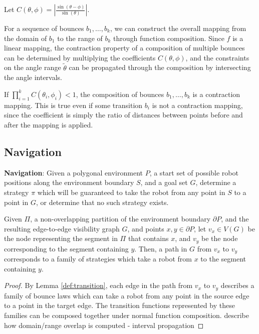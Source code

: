 \documentclass[]{styles/svproc}  %
\begin{document}
Let $C(\theta, \phi) = | \frac{\sin(\theta - \phi)}{\sin(\theta)} |$.

For a sequence of bounces $b_1, \ldots, b_k$, we can construct the overall
mapping from the domain of $b_1$ to the range of $b_k$ through function
composition. Since $f$ is a linear mapping, the contraction property of a composition 
of multiple bounces can be determined by multiplying the coefficients $C(\theta, \phi)$, 
and the constraints on the angle range $\tilde{\theta}$ can be propagated through the 
composition by intersecting the angle intervals.

If $\prod_{i=1}^k C(\theta_i, \phi_i) < 1$, the composition of bounces $b_1, \ldots, b_k$
is a contraction mapping. This is true even if some transition $b_i$ is not a
contraction mapping, since the coefficient is simply the ratio of distances
between points before and after the mapping is applied.

\subsection{Navigation}

\begin{definition}
\textbf{Navigation}:
Given a polygonal environment $P$, a start set of possible robot positions along the
environment boundary $S$, and a goal set $G$, determine a strategy $\pi$ which
will be guaranteed to take the robot from any point in $S$ to a point in $G$, or
determine that no such strategy exists.
\end{definition}

\begin{lemma}
Given $\Pi$, a non-overlapping partition of the environment boundary $\partial P$, and the resulting edge-to-edge visibility graph
$G$, and points $x,y \in \partial P$, let $v_x \in V(G)$ be the node representing
the segment in $\Pi$ that contains $x$, and $v_y$ be the node corresponding to
the segment containing $y$. Then, a path in $G$ from $v_x$ to $v_y$ corresponds
to a family of strategies which take a robot from $x$ to the segment containing
$y$.
\end{lemma}

\begin{proof}
By Lemma \ref{def:transition}, each edge in the path from $v_x$ to $v_y$
describes a family of bounce laws which can take a robot from any point in the
source edge to a point in the target edge. The transition functions represented
by these families can be composed together under normal function composition.
{\color{red} describe how domain/range overlap is computed - interval propagation}
\end{proof}
\end{document}

